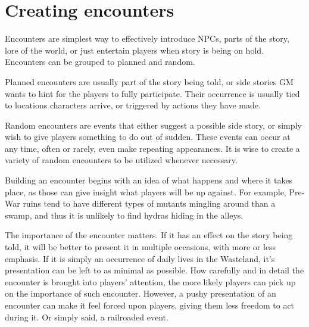 \documentclass[11pt,a4paper,twocolumn]{book}
\begin{document}
    \section*{Creating encounters}
    Encounters are simplest way to effectively introduce NPCs, parts of the story, lore of the world, or just entertain players when story is being on hold. Encounters can be grouped to planned and random. 
    
    Planned encounters are usually part of the story being told, or side stories GM wants to hint for the players to fully participate. Their occurrence is usually tied to locations characters arrive, or triggered by actions they have made.
    
    Random encounters are events that either suggest a possible side story, or simply wish to give players something to do out of sudden. These events can occur at any time, often or rarely, even make repeating appearances. It is wise to create a variety of random encounters to be utilized whenever necessary.
    
    Building an encounter begins with an idea of what happens and where it takes place, as those can give insight what players will be up against. For example, Pre-War ruins tend to have different types of mutants mingling around than a swamp, and thus it is unlikely to find hydras hiding in the alleys.

    The importance of the encounter matters. If it has an effect on the story being told, it will be better to present it in multiple occasions, with more or less emphasis. If it is simply an occurrence of daily lives in the Wasteland, it's presentation can be left to as minimal as possible.
    How carefully and in detail the encounter is brought into players' attention, the more likely players can pick up on the importance of such encounter. However, a pushy presentation of an encounter can make it feel forced upon players, giving them less freedom to act during it. Or simply said, a railroaded event.
    
\end{document}
